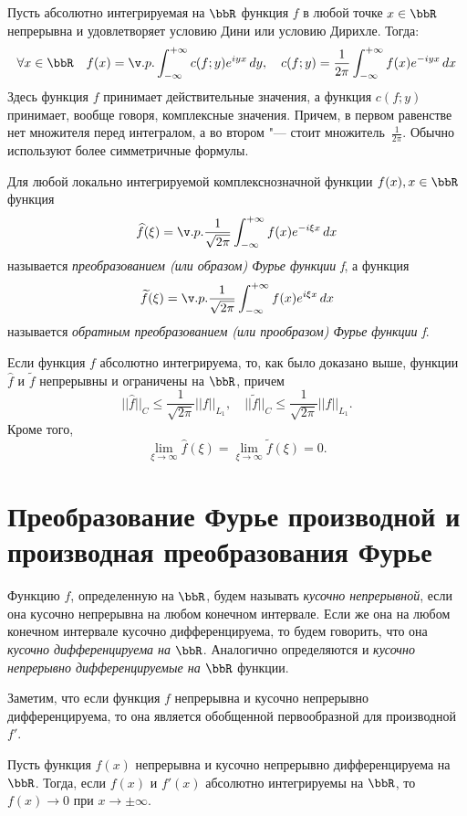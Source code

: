 Пусть абсолютно интегрируемая на $\bbR$ функция $f$ в любой точке $x \in \bbR$ непрерывна и удовлетворяет условию Дини или условию Дирихле. Тогда:
$$
\forall x \in \bbR\quad f(x) = \v.p.\int_{-\infty}^{+\infty} c(f;y)e^{iyx}\,dy,\quad c(f;y)=\frac{1}{2\pi}\int_{-\infty}^{+\infty} f(x)e^{-iyx}\,dx
$$
Здесь функция $f$ принимает действительные значения, а функция $c(f;y)$ принимает, вообще говоря, комплексные значения. Причем, в первом равенстве нет множителя перед интегралом, а во втором "--- стоит множитель~$\frac{1}{2\pi}$. Обычно используют более симметричные формулы.
\begin{defn}
Для любой локально интегрируемой комплекснозначной функции $f(x), x \in \bbR$ функция
$$
\widehat{f}(\xi) = \v.p.\frac{1}{\sqrt{2\pi}} \int_{-\infty}^{+\infty} f(x)e^{-i\xi x}\,dx
$$
называется \textit{преобразованием (или образом) Фурье функции f}, а функция
$$
\widetilde{f}(\xi) = \v.p.\frac{1}{\sqrt{2\pi}} \int_{-\infty}^{+\infty} f(x)e^{i\xi x}\,dx
$$
называется \textit{обратным преобразованием (или прообразом) Фурье функции f}.
\end{defn}
Если функция $f$ абсолютно интегрируема, то, как было доказано выше, функции $\widehat{f}$ и $\widetilde{f}$ непрерывны и ограничены на $\bbR$, причем
$$
||\widehat{f}||_C \le \frac{1}{\sqrt{2\pi}}||f||_{L_1}, \quad ||\widetilde{f}||_C \le \frac{1}{\sqrt{2\pi}}||f||_{L_1}.
$$
Кроме того,
$$
\lim_{\xi \to \infty} \widehat{f}(\xi) = \lim_{\xi \to \infty} \widetilde{f}(\xi) = 0.
$$

\section{Преобразование Фурье производной и производная преобразования Фурье}

Функцию $f$, определенную на $\bbR$, будем называть \textit{кусочно непрерывной}, если она кусочно непрерывна на любом конечном интервале. Если же она на любом конечном интервале кусочно дифференцируема, то будем говорить, что она \textit{кусочно дифференцируема на $\bbR$}. Аналогично определяются и \textit{кусочно непрерывно дифференцируемые на $\bbR$} функции. 

Заметим, что если функция $f$ непрерывна и кусочно непрерывно дифференцируема, то она является обобщенной первообразной для производной~$f'$.

\begin{lemm}
Пусть функция $f(x)$ непрерывна и кусочно непрерывно дифференцируема на $\bbR$. Тогда, если $f(x)$ и $f'(x)$ абсолютно интегрируемы на $\bbR$, то $f(x)\to 0$ при $x\to\pm\infty$.
\end{lemm}

